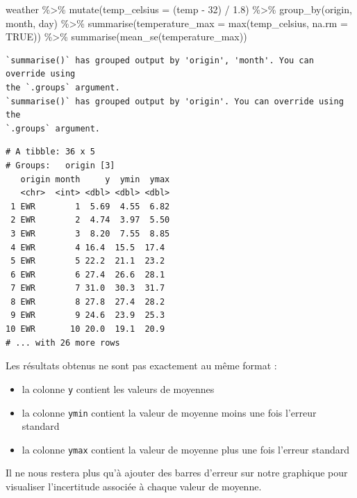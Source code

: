 \documentclass[
  a4paper,
  DIV=11,
  numbers=noendperiod,
  oneside]{scrreprt}
\newenvironment{Shaded}{}{}
\newcommand{\AttributeTok}[1]{\textcolor[rgb]{0.84,0.23,0.29}{#1}}
\newcommand{\ConstantTok}[1]{\textcolor[rgb]{0.00,0.36,0.77}{#1}}
\newcommand{\DecValTok}[1]{\textcolor[rgb]{0.00,0.36,0.77}{#1}}
\newcommand{\FloatTok}[1]{\textcolor[rgb]{0.00,0.36,0.77}{#1}}
\newcommand{\FunctionTok}[1]{\textcolor[rgb]{0.44,0.26,0.76}{#1}}
\newcommand{\NormalTok}[1]{\textcolor[rgb]{0.14,0.16,0.18}{#1}}
\newcommand{\SpecialCharTok}[1]{\textcolor[rgb]{0.00,0.36,0.77}{#1}}
\providecommand{\tightlist}{%
  \setlength{\itemsep}{0pt}\setlength{\parskip}{0pt}}\usepackage{longtable,booktabs,array}
\begin{document}
\begin{Shaded}
\begin{Highlighting}[]
\NormalTok{weather }\SpecialCharTok{\%\textgreater{}\%} 
  \FunctionTok{mutate}\NormalTok{(}\AttributeTok{temp\_celsius =}\NormalTok{ (temp }\SpecialCharTok{{-}} \DecValTok{32}\NormalTok{) }\SpecialCharTok{/} \FloatTok{1.8}\NormalTok{) }\SpecialCharTok{\%\textgreater{}\%} 
  \FunctionTok{group\_by}\NormalTok{(origin, month, day) }\SpecialCharTok{\%\textgreater{}\%} 
  \FunctionTok{summarise}\NormalTok{(}\AttributeTok{temperature\_max =} \FunctionTok{max}\NormalTok{(temp\_celsius, }\AttributeTok{na.rm =} \ConstantTok{TRUE}\NormalTok{)) }\SpecialCharTok{\%\textgreater{}\%} 
  \FunctionTok{summarise}\NormalTok{(}\FunctionTok{mean\_se}\NormalTok{(temperature\_max))}
\end{Highlighting}
\end{Shaded}

\begin{verbatim}
`summarise()` has grouped output by 'origin', 'month'. You can override using
the `.groups` argument.
`summarise()` has grouped output by 'origin'. You can override using the
`.groups` argument.
\end{verbatim}

\begin{verbatim}
# A tibble: 36 x 5
# Groups:   origin [3]
   origin month     y  ymin  ymax
   <chr>  <int> <dbl> <dbl> <dbl>
 1 EWR        1  5.69  4.55  6.82
 2 EWR        2  4.74  3.97  5.50
 3 EWR        3  8.20  7.55  8.85
 4 EWR        4 16.4  15.5  17.4 
 5 EWR        5 22.2  21.1  23.2 
 6 EWR        6 27.4  26.6  28.1 
 7 EWR        7 31.0  30.3  31.7 
 8 EWR        8 27.8  27.4  28.2 
 9 EWR        9 24.6  23.9  25.3 
10 EWR       10 20.0  19.1  20.9 
# ... with 26 more rows
\end{verbatim}

Les résultats obtenus ne sont pas exactement au même format :

\begin{itemize}
\tightlist
\item
  la colonne \texttt{y} contient les valeurs de moyennes
\item
  la colonne \texttt{ymin} contient la valeur de moyenne moins une fois
  l'erreur standard
\item
  la colonne \texttt{ymax} contient la valeur de moyenne plus une fois
  l'erreur standard
\end{itemize}

Il ne nous restera plus qu'à ajouter des barres d'erreur sur notre
graphique pour visualiser l'incertitude associée à chaque valeur de
moyenne.
\end{document}
